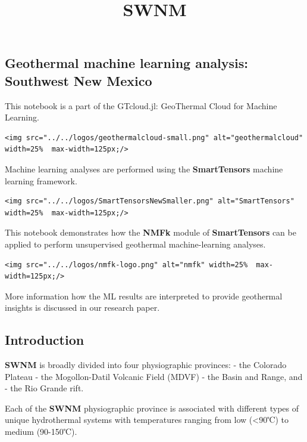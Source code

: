 \documentclass[11pt]{article}
\title{SWNM}
\begin{document}
    
    \maketitle
    
    

    
    \hypertarget{geothermal-machine-learning-analysis-southwest-new-mexico}{%
\subsection{Geothermal machine learning analysis: Southwest New
Mexico}\label{geothermal-machine-learning-analysis-southwest-new-mexico}}

This notebook is a part of the GTcloud.jl: GeoThermal Cloud for Machine
Learning.

\begin{verbatim}
<img src="../../logos/geothermalcloud-small.png" alt="geothermalcloud" width=25%  max-width=125px;/>
\end{verbatim}

Machine learning analyses are performed using the \textbf{SmartTensors}
machine learning framework.

\begin{verbatim}
<img src="../../logos/SmartTensorsNewSmaller.png" alt="SmartTensors" width=25%  max-width=125px;/>
\end{verbatim}

This notebook demonstrates how the \textbf{NMFk} module of
\textbf{SmartTensors} can be applied to perform unsupervised geothermal
machine-learning analyses.

\begin{verbatim}
<img src="../../logos/nmfk-logo.png" alt="nmfk" width=25%  max-width=125px;/>
\end{verbatim}

More information how the ML results are interpreted to provide
geothermal insights is discussed in our research paper.

    \hypertarget{introduction}{%
\subsection{Introduction}\label{introduction}}

\textbf{SWNM} is broadly divided into four physiographic provinces: -
the Colorado Plateau - the Mogollon-Datil Volcanic Field (MDVF) - the
Basin and Range, and - the Rio Grande rift.

Each of the \textbf{SWNM} physiographic province is associated with
different types of unique hydrothermal systems with temperatures ranging
from low (\textless90℃) to medium (90-150℃).
\end{document}
